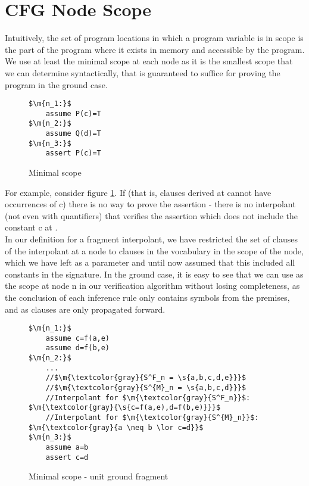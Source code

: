 \newpage
\section{CFG Node Scope}\label{section:scoping:node_scope}
Intuitively, the set of program locations in which a program variable is in scope is the part of the program where it exists in memory and accessible by the program. We use at least the minimal scope at each node as it is the smallest scope that we can determine syntactically, that is guaranteed to suffice for proving the program in the ground case.

\begin{figure}
\begin{lstlisting}
$\m{n_1:}$
	assume P(c)=T
$\m{n_2:}$
	assume Q(d)=T
$\m{n_3:}$
	assert P(c)=T
\end{lstlisting}
\caption{Minimal scope}
\label{snippet4.2.1}
\end{figure}

For example, consider figure \ref{snippet4.2.1}.
If  (that is, clauses derived at  cannot have occurrences of c) there is no way to prove the assertion - there is no interpolant (not even with quantifiers) that verifies the assertion which does not include the constant c at .\\
In our definition for a fragment interpolant, we have restricted the set of clauses of the interpolant at a node to clauses in the vocabulary in the scope of the node, which we have left as a parameter and until now assumed that this included all constants in the signature. 
In the ground case, it is easy to see that we can use  as the scope at node n in our verification algorithm without losing completeness, as the conclusion of each inference rule only contains symbols from the premises, and as clauses are only propagated forward.

\begin{figure}
\begin{lstlisting}
$\m{n_1:}$
	assume c=f(a,e)
	assume d=f(b,e)
$\m{n_2:}$
	...
	//$\m{\textcolor{gray}{S^F_n = \s{a,b,c,d,e}}}$
	//$\m{\textcolor{gray}{S^{M}_n = \s{a,b,c,d}}}$
	//Interpolant for $\m{\textcolor{gray}{S^F_n}}$: $\m{\textcolor{gray}{\s{c=f(a,e),d=f(b,e)}}}$
	//Interpolant for $\m{\textcolor{gray}{S^{M}_n}}$: $\m{\textcolor{gray}{a \neq b \lor c=d}}$
$\m{n_3:}$
	assume a=b
	assert c=d
\end{lstlisting}
\caption{Minimal scope - unit ground fragment}
\label{snippet4.2.2}
\end{figure}

